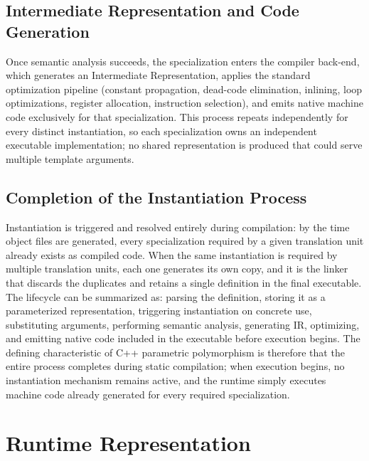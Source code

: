 \documentclass[11pt]{report}
\begin{document}

\subsection{Intermediate Representation and Code Generation}

Once semantic analysis succeeds, the specialization enters the compiler back-end,
which generates an Intermediate Representation, applies the standard optimization
pipeline (constant propagation, dead-code elimination, inlining, loop
optimizations, register allocation, instruction selection), and emits native
machine code exclusively for that specialization. This process repeats
independently for every distinct instantiation, so each specialization owns an
independent executable implementation; no shared representation is produced that
could serve multiple template arguments.

\subsection{Completion of the Instantiation Process}
\label{CppTemplates:InstantiationTimeCompletion}

Instantiation is triggered and resolved entirely during compilation: by the
time object files are generated, every specialization required by a given
translation unit already exists as compiled code. When the same instantiation
is required by multiple translation units, each one generates its own copy,
and it is the linker that discards the duplicates and retains a single
definition in the final executable. 
The lifecycle can be summarized as: parsing the definition, storing it as a
parameterized representation, triggering instantiation on concrete use,
substituting arguments, performing semantic analysis, generating IR, optimizing,
and emitting native code included in the executable before execution begins.
The defining characteristic of C++ parametric polymorphism is therefore that
the entire process completes during static compilation; when execution begins, no
instantiation mechanism remains active, and the runtime simply executes machine
code already generated for every required specialization.

\section{Runtime Representation}
\label{CppTemplates:RuntimeRepresentation}
\end{document}
